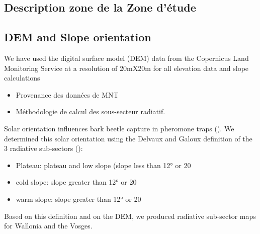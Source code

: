 \documentclass[3p,times]{elsarticle}
\begin{document}
\subsection{Description zone de la Zone d'étude}

	



\subsection{DEM and Slope orientation}


We have used the digital surface model (DEM) data from the Copernicus Land Monitoring Service \citep{DEM_copernicus}  at a resolution of 20mX20m for all elevation data and slope calculations

\begin{itemize}
	\item Provenance des données de MNT
	\item Méthodologie de calcul des sous-secteur radiatif.
\end{itemize}

Solar orientation influences bark beetle capture in pheromone traps (\citep{AFR64}). We determined this solar orientation using the Delvaux and Galoux definition of the 3 radiative sub-sectors  (\citep{Delvaux_galoux}):
\begin{itemize} 
\item Plateau: plateau and low slope (slope less than 12° or 20%
\item cold slope: slope greater than 12° or 20%
\item warm slope: slope greater than 12° or 20%
\end{itemize}
Based on this definition and on the DEM, we produced radiative sub-sector maps for Wallonia and the Vosges.
\end{document}
